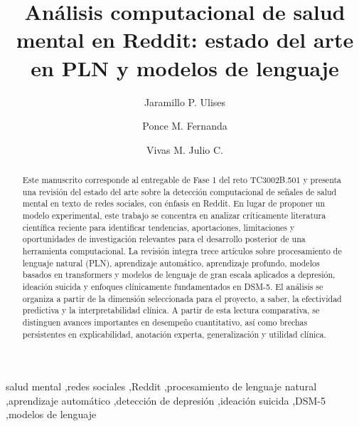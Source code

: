 \documentclass[final,5p,times,authoryear]{elsarticle}
\def\fnref#1{}%
\begin{document}
\begin{frontmatter}

\title{Análisis computacional de salud mental en Reddit: estado del arte en PLN y modelos de lenguaje}

\author[tec]{Jaramillo P. Ulises\fnref{ulises}}
\author[tec]{Ponce M. Fernanda\fnref{fernanda}}
\author[tec]{Vivas M. Julio C.\fnref{julio}}


\address[tec]{TC3002B.501 Desarrollo de aplicaciones avanzadas de ciencias computacionales, Equipo 6, Tecnológico de Monterrey Campus Estado de México, Escuela de Ingeniería y Ciencias}

\begin{abstract}
Este manuscrito corresponde al entregable de Fase 1 del reto TC3002B.501 y presenta una revisión del estado del arte sobre la detección computacional de señales de salud mental en texto de redes sociales, con énfasis en Reddit. En lugar de proponer un modelo experimental, este trabajo se concentra en analizar críticamente literatura científica reciente para identificar tendencias, aportaciones, limitaciones y oportunidades de investigación relevantes para el desarrollo posterior de una herramienta computacional. La revisión integra trece artículos sobre procesamiento de lenguaje natural (PLN), aprendizaje automático, aprendizaje profundo, modelos basados en transformers y modelos de lenguaje de gran escala aplicados a depresión, ideación suicida y enfoques clínicamente fundamentados en DSM-5. El análisis se organiza a partir de la dimensión seleccionada para el proyecto, a saber, la efectividad predictiva y la interpretabilidad clínica. A partir de esta lectura comparativa, se distinguen avances importantes en desempeño cuantitativo, así como brechas persistentes en explicabilidad, anotación experta, generalización y utilidad clínica.
\end{abstract}

\begin{keyword}
salud mental \sep redes sociales \sep Reddit \sep procesamiento de lenguaje natural \sep aprendizaje automático \sep detección de depresión \sep ideación suicida \sep DSM-5 \sep modelos de lenguaje
\end{keyword}

\end{frontmatter}






\FloatBarrier







\end{document}
